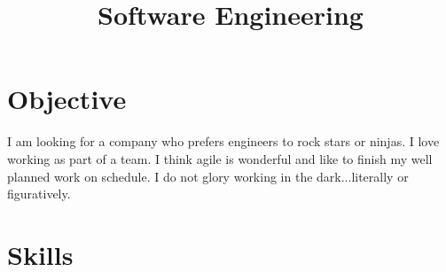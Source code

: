 \documentclass[letter]{moderncv}
\title{Software Engineering}
\begin{document}
\maketitle

\section{Objective}
I am looking for a company who prefers engineers to rock stars or ninjas.
I love working as part of a team.
I think agile is wonderful and like to finish my well planned work on schedule.
I do not glory working in the dark...literally or figuratively.
\section{Skills}
\end{document}
